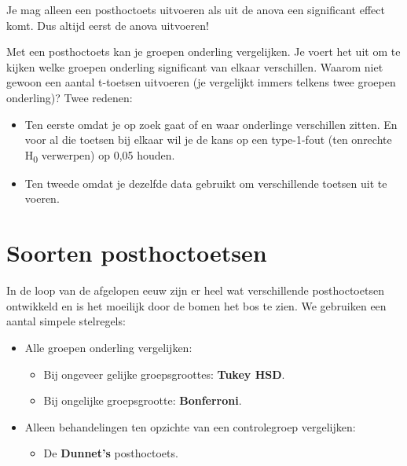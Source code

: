 \documentclass[
  letterpaper,
  DIV=11,
  numbers=noendperiod]{scrreprt}
\providecommand{\tightlist}{%
  \setlength{\itemsep}{0pt}\setlength{\parskip}{0pt}}\usepackage{longtable,booktabs,array}
\theoremstyle{definition}
\theoremstyle{remark}
\begin{document}
\begin{tcolorbox}[enhanced jigsaw, colbacktitle=quarto-callout-color!10!white, colframe=quarto-callout-color-frame, leftrule=.75mm, title={Warning}, coltitle=black, toprule=.15mm, colback=white, breakable, opacityback=0, bottomrule=.15mm, arc=.35mm, opacitybacktitle=0.6, bottomtitle=1mm, toptitle=1mm, rightrule=.15mm, titlerule=0mm, left=2mm]
Je mag alleen een posthoctoets uitvoeren als uit de anova een
significant effect komt. Dus altijd eerst de anova uitvoeren!
\end{tcolorbox}

Met een posthoctoets kan je groepen onderling vergelijken. Je voert het
uit om te kijken welke groepen onderling significant van elkaar
verschillen. Waarom niet gewoon een aantal t-toetsen uitvoeren (je
vergelijkt immers telkens twee groepen onderling)? Twee redenen:

\begin{itemize}
\tightlist
\item
  Ten eerste omdat je op zoek gaat of en waar onderlinge verschillen
  zitten. En voor al die toetsen bij elkaar wil je de kans op een
  type-1-fout (ten onrechte H\textsubscript{0} verwerpen) op 0,05
  houden.
\item
  Ten tweede omdat je dezelfde data gebruikt om verschillende toetsen
  uit te voeren.
\end{itemize}

\hypertarget{soorten-posthoctoetsen}{%
\section{Soorten posthoctoetsen}\label{soorten-posthoctoetsen}}

In de loop van de afgelopen eeuw zijn er heel wat verschillende
posthoctoetsen ontwikkeld en is het moeilijk door de bomen het bos te
zien. We gebruiken een aantal simpele stelregels:

\begin{itemize}
\tightlist
\item
  Alle groepen onderling vergelijken:

  \begin{itemize}
  \tightlist
  \item
    Bij ongeveer gelijke groepsgroottes: \textbf{Tukey HSD}.
  \item
    Bij ongelijke groepsgrootte: \textbf{Bonferroni}.
  \end{itemize}
\item
  Alleen behandelingen ten opzichte van een controlegroep vergelijken:

  \begin{itemize}
  \tightlist
  \item
    De \textbf{Dunnet's} posthoctoets.
  \end{itemize}
\end{itemize}
\end{document}
